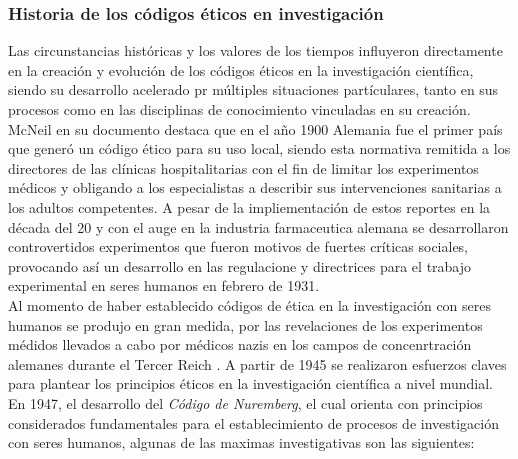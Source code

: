\subsubsection*{Historia de los códigos éticos en investigación}
Las circunstancias históricas y los valores de los tiempos influyeron directamente en la creación y evolución 
de los códigos éticos en la investigación científica, siendo su desarrollo acelerado pr múltiples situaciones partículares, 
tanto en sus procesos como en las disciplinas de conocimiento vinculadas en su creación. McNeil en su documento \cite{McInerney2001} destaca 
que en el año 1900 Alemania fue el primer país que generó un código ético para su uso local, siendo esta normativa remitida
a los directores de las clínicas hospitalitarias con el fin de limitar los experimentos médicos y obligando a los especialistas 
a describir sus intervenciones sanitarias a los adultos competentes. A pesar de la impliementación de estos reportes en la década 
del 20 y con el auge en la industria farmaceutica alemana se desarrollaron controvertidos experimentos que fueron motivos de fuertes 
críticas sociales, provocando así un desarrollo en las regulacione y directrices para el trabajo experimental en seres humanos 
en febrero de 1931.\\
Al momento de haber establecido códigos de ética en la investigación con seres humanos se produjo en gran medida, por las revelaciones de 
los experimentos médidos llevados a cabo por médicos nazis en los campos de concenrtración alemanes durante el Tercer Reich \cite{Schuklenk2000}. 
A partir de 1945 se realizaron esfuerzos claves para plantear los principios éticos en la investigación científica a nivel mundial. En 1947, el desarrollo
del \textit{Código de Nuremberg}, el cual orienta con principios considerados fundamentales para el establecimiento de procesos de investigación
con seres humanos, algunas de las maximas investigativas son las siguientes\cite{NurembergCode}:

